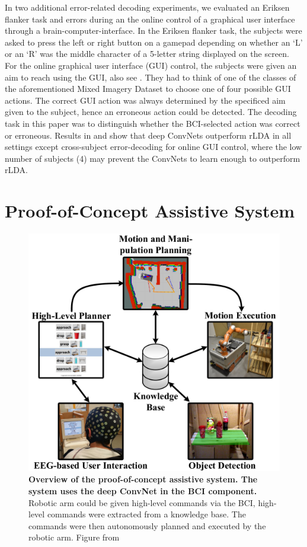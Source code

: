     In two additional error-related decoding experiments, we evaluated an
Eriksen flanker task and errors during an the online control of a
graphical user interface through a brain-computer-interface. In the
Eriksen flanker task, the subjects were asked to press the left or right
button on a gamepad depending on whether an `L' or an `R' was the middle
character of a 5-letter string displayed on the screen. For the online
graphical user interface (GUI) control, the subjects were given an aim
to reach using the GUI, also see . They had to
think of one of the classes of the aforementioned Mixed Imagery Dataset
to choose one of four possible GUI actions. The correct GUI action was
always determined by the specificed aim given to the subject, hence an
erroneous action could be detected. The decoding task in this paper was
to distinguish whether the BCI-selected action was correct or erroneous.
Results in  and
 show that deep ConvNets
outperform rLDA in all settings except cross-subject error-decoding for
online GUI control, where the low number of subjects (4) may prevent the
ConvNets to learn enough to outperform rLDA.

\section{Proof-of-Concept Assistive
System}\label{proof-of-concept-assistive-system}


\begin{figure}[htb]
    \myfloatalign
    \includegraphics[width=0.7\linewidth]{images/robot-bci-overview.png}
    \caption[Overview of the proof-of-concept assistive system]{
\textbf{Overview of the proof-of-concept assistive system. The system
uses the deep ConvNet in the BCI component.} Robotic arm could be given high-level commands via the BCI, high-level commands were extracted from a knowledge base. The commands were then autonomously planned and executed by the robotic arm. Figure
from \citet{burget2017acting}
}
\label{robot-bci-overview-fig}
\end{figure}



